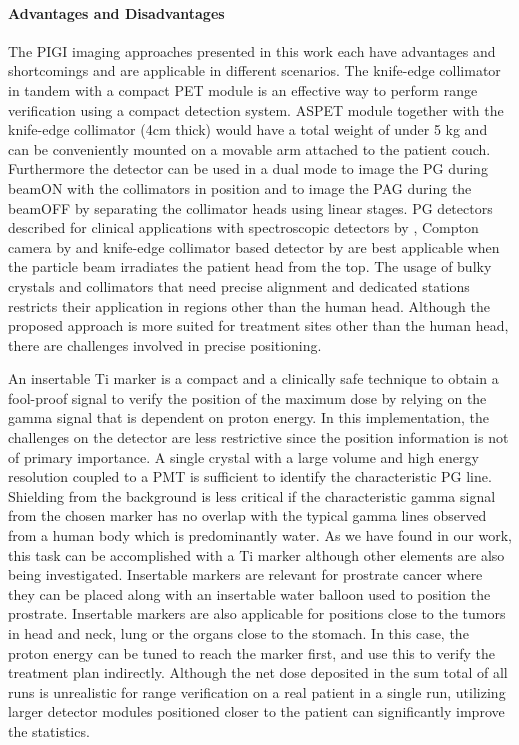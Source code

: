 \documentclass[11pt,a4paper]{article}
\begin{document}
\paragraph{Advantages and Disadvantages}
The PIGI imaging approaches presented in this work each have  advantages and shortcomings and are applicable in different scenarios. The knife-edge collimator in tandem with a compact PET module is an effective way to perform range verification using a compact detection system.  ASPET module together with the knife-edge collimator (4cm thick) would have a total weight of under 5 kg and can be conveniently mounted on a movable arm attached to the patient couch. Furthermore the detector can be used in a dual mode to image the PG during beamON with the collimators in position and to image the PAG during the beamOFF by separating the collimator heads using linear stages. PG detectors described for clinical applications with spectroscopic detectors by \cite{Verburg2018}, Compton camera by \cite{Draeger2018} and  knife-edge collimator based detector by \cite{Smeets2016} are best applicable when the particle beam irradiates the patient head from the top. The usage of bulky crystals and collimators that need precise alignment and dedicated stations restricts their application in regions other than the human head. Although the proposed approach is more suited for treatment sites other than the human head, there are challenges involved in precise positioning.

An insertable Ti marker is a compact and a clinically safe technique to obtain a fool-proof signal to verify the position of the maximum dose by relying on the gamma signal that is dependent on proton energy. In this implementation, the challenges on the detector are less restrictive since the position information is not of primary importance. A single crystal with a large volume and high energy resolution coupled to a PMT is sufficient to identify the characteristic PG line. Shielding from the background is less critical if the characteristic gamma signal from the chosen marker has no overlap with the typical gamma lines observed from a human body which is predominantly water. As we have found in our work, this task can be accomplished with a Ti marker although other elements are also being investigated. Insertable markers are relevant for prostrate cancer where they can be placed along with an insertable water balloon used to position the prostrate. Insertable markers are also applicable for positions close to the  tumors in head and neck, lung or the organs close to the stomach. In this case, the proton energy can be tuned to reach the marker first, and use this to verify the treatment plan indirectly. Although the net dose deposited in the sum total of all runs is unrealistic for range verification on a real patient in a single run, utilizing larger detector modules positioned closer to the patient can significantly improve the statistics.
\end{document}
